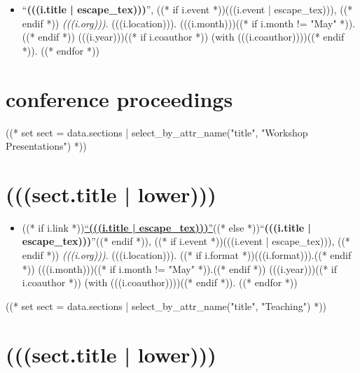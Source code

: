 \documentclass[10pt,oneside]{article}
\begin{document}
\mbox{}\vspace{-\dimexpr\baselineskip\relax}

\begin{itemize}[label={}]
  ((* for i in sect.entries.talks | sort_by_attr(["year"], reverse=True) *))
  \item \enquote{\textbf{(((i.title | escape_tex)))}}, ((* if i.event *))(((i.event | escape_tex))), ((* endif *)) \textit{(((i.org)))}. (((i.location))). (((i.month)))((* if i.month != "May" *)).((* endif *)) (((i.year)))((* if i.coauthor *)) (with (((i.coauthor))))((* endif *)).
        ((* endfor *))
\end{itemize}

\section{conference proceedings}

\mbox{}\vspace{-\dimexpr\baselineskip\relax}
\vspace*{-1em}
\printbibliography[type=inproceedings, heading=none]

((* set sect = data.sections | select_by_attr_name("title", "Workshop Presentations") *))
\section{(((sect.title | lower)))}

\mbox{}\vspace{-\dimexpr\baselineskip\relax}

\begin{itemize}[label={}]
  ((* for i in sect.entries.workshops | sort_by_attr(["year"], reverse=True) *))
  \item ((* if i.link *))\href{(((i.link)))}{\enquote{\textbf{(((i.title | escape_tex)))}}}((* else *))\enquote{\textbf{(((i.title | escape_tex)))}}((* endif *)), ((* if i.event *))(((i.event | escape_tex))), ((* endif *)) \textit{(((i.org)))}. (((i.location))). ((* if i.format *))(((i.format))).((* endif *)) (((i.month)))((* if i.month != "May" *)).((* endif *)) (((i.year)))((* if i.coauthor *)) (with (((i.coauthor))))((* endif *)).
        ((* endfor *))
\end{itemize}

((* set sect = data.sections | select_by_attr_name("title", "Teaching") *))
\section{(((sect.title | lower)))}
\end{document}
